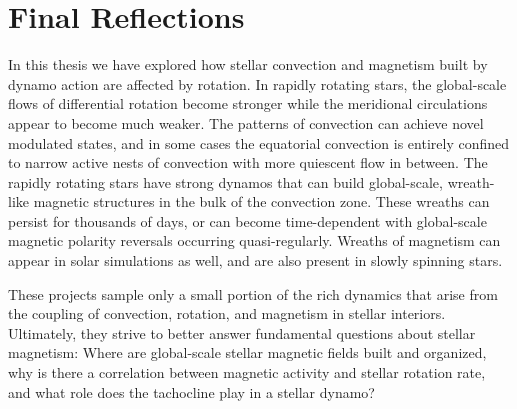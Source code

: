\clearpage
\section{Final Reflections}
In this thesis we have explored how stellar convection and magnetism
built by dynamo action are affected by rotation.  In rapidly rotating
stars, the global-scale flows of differential rotation become stronger
while the meridional circulations appear to become much weaker.  The
patterns of convection can achieve novel modulated states, and in some
cases the equatorial convection is entirely confined to narrow active
nests of convection with more quiescent flow in between.  The rapidly
rotating stars have strong dynamos that can build global-scale,
wreath-like magnetic structures in the bulk of the convection zone.
These wreaths can persist for thousands of days, or can become
time-dependent with global-scale magnetic polarity reversals occurring
quasi-regularly.  Wreaths of magnetism can appear in solar simulations
as well, and are also present in slowly spinning stars.

These projects sample only a small portion of the rich dynamics that
arise from the coupling of convection, rotation, and magnetism in
stellar interiors.  Ultimately, they strive to better answer
fundamental questions about stellar magnetism:  Where are global-scale
stellar magnetic fields built and organized, why is there a
correlation between magnetic activity and stellar rotation rate, and
what role does the tachocline play in a stellar dynamo? 



